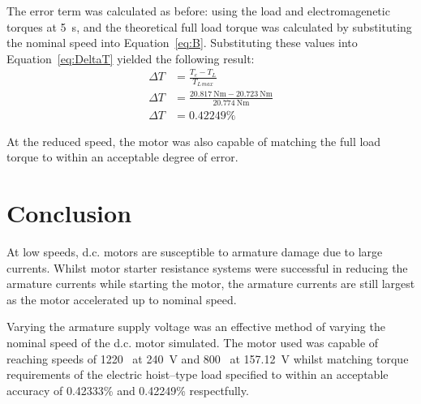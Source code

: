 \documentclass[a4paper,11pt,twocolumn]{article}
\newcommand{\s}{\si{\second}\xspace}
\newcommand{\V}{\si{\volt}\xspace}
\newcommand{\Nm}{\si{\newton\metre}\xspace}
\newcommand{\RPM}{\text{RPM}\xspace}
\newcommand{\DC}{d.c.\xspace}
\begin{document}
The error term was calculated as before: using the load and electromagenetic 
torques at 5~\s, and the theoretical full load torque was calculated by 
substituting the nominal speed into Equation~\ref{eq:B}. Substituting these 
values into Equation~\ref{eq:DeltaT} yielded the following result:
\begin{align*}
    \Delta T &= \frac{T_e - T_L}{T_{L\,max}} \\
    \Delta T &= \frac{20.817~\Nm - 20.723~\Nm}{20.774~\Nm} \\
    \Delta T &= 0.42249\%
\end{align*}

At the reduced speed, the motor was also capable of matching the full load 
torque to within an acceptable degree of error.

\section{Conclusion}

At low speeds, \DC motors are susceptible to armature damage due to large 
currents. Whilst motor starter resistance systems were successful in reducing 
the armature currents while starting the motor, the armature currents are still 
largest as the motor accelerated up to nominal speed.

Varying the armature supply voltage was an effective method of varying the 
nominal speed of the \DC motor simulated. The motor used was capable of 
reaching speeds of 1220~\RPM at 240~\V and 800~\RPM at 157.12~\V whilst 
matching torque requirements of the electric hoist--type load specified to 
within an acceptable accuracy of 0.42333\% and 0.42249\% respectfully.

\printbibliography
\end{document}
